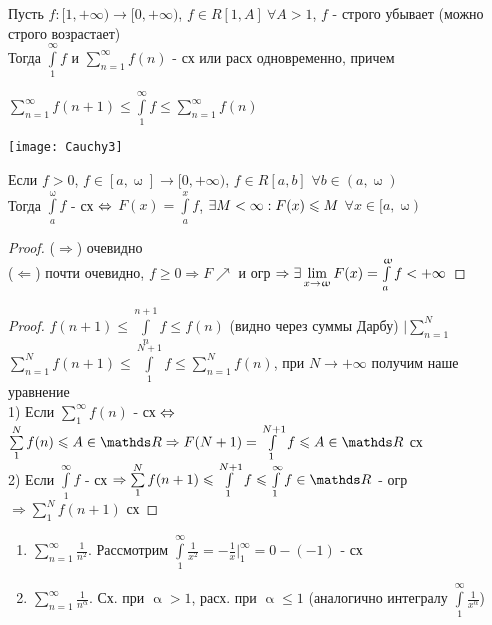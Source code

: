 \documentclass[12pt, fleqn]{article}
\begin{document}
\begin{Property}[3]
\begin{Property}[4]
\begin{Property}[2, аддитивность]
\begin{Proof}
\begin{theorem}
    Пусть $f: [1, +\infty) \rightarrow [0, +\infty)$, $f \in R[1,A]\ \forall A > 1$, $f$ - строго убывает (можно строго возрастает)
    \\
    Тогда $\int\limits_1^\infty f$ и $\sum\limits_{n=1}^\infty f(n)$ - сх или расх одновременно, причем
    
    $\sum\limits_{n=1}^\infty f(n+1) \leqslant \int\limits_1^\infty f \leqslant \sum\limits_{n=1}^{\infty} f(n)$
    
    \texttt{[image: Cauchy3]}
\end{theorem}

\begin{lemma}
    Если $f>0$, $f \in [a, \upomega] \rightarrow [0, +\infty)$, $f\in R[a,b]$ $\forall b \in (a, \upomega)$
    \\
    Тогда $\int\limits_a^\upomega f$ - сх $\Leftrightarrow$ $F(x) = \int\limits_a^x f$, $\exists M < \infty:  F(x) \leqslant M $ $\forall x \in [a, \upomega)$
\end{lemma}

\begin{proof}
    ($\Rightarrow$) очевидно
    \\
    ($\Leftarrow$) почти очевидно, $f \geqslant 0 \Rightarrow F \nearrow$ и огр $\Rightarrow \exists \lim\limits_{x \rightarrow \upomega} F(x) = \int\limits_a^\upomega f < +\infty$
\end{proof}

\begin{proof}
    $f(n+1) \leqslant \int\limits_n^{n+1} f \leqslant f(n)$ (видно через суммы Дарбу) $|\sum\limits_{n=1}^N$
    \\
    $\sum\limits_{n=1}^N f(n+1) \leqslant \int\limits_1^{N+1} f \leqslant \sum\limits_{n=1}^N f(n)$, при $N \rightarrow +\infty$ получим наше уравнение
    \\
    1) Если $\sum\limits_1^\infty f (n)$ - сх $\Leftrightarrow$ $\sum\limits_1^N f(n) \leqslant A \in \R \Rightarrow F(N+1) = \int\limits_1^{N+1} f \leqslant A \in \R$ сх
    \\
    2) Если $\int\limits_1^\infty f$ - сх $\Rightarrow \sum\limits_1^N f(n+1) \leqslant \int\limits_1^{N+1} f \leqslant \int\limits_1^\infty f \in \R$ - огр $\Rightarrow \sum\limits_1^N f(n+1)$ сх
\end{proof}

\begin{examples}
    \begin{enumerate}
        \item $\sum\limits_{n=1}^\infty \frac{1}{n^2}$. Рассмотрим $\int\limits_1^\infty \frac{1}{x^2} = - \frac{1}{x} |_1^\infty = 0 - (-1)$ - сх
        \item $\sum\limits_{n=1}^\infty \frac{1}{n^\upalpha}$. Сх. при $\upalpha > 1$, расх. при $\upalpha \leqslant 1$ (аналогично интегралу $\int\limits_{1}^\infty \frac{1}{x^\upalpha}$)
    \end{enumerate}
\end{examples}


\end{Proof}
\end{Property}
\end{Property}
\end{Property}
\end{document}
